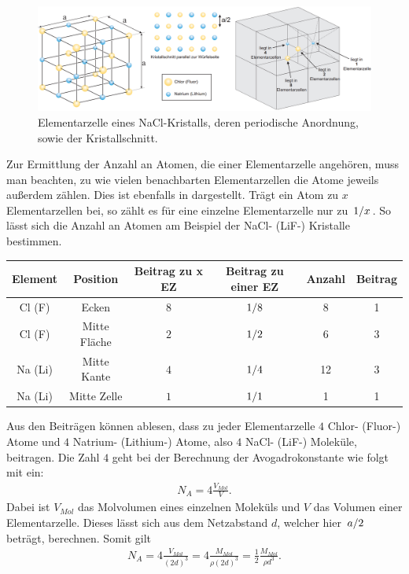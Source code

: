 \begin{figure}[H]
  \centering
  \includegraphics[width=\textwidth]{files/elementarzelle_nacl_reordered.png}
  \caption{Elementarzelle eines NaCl-Kristalls, deren periodische Anordnung, sowie der Kristallschnitt.}
  \label{fig:elementarzelle_nacl_reordered}
\end{figure}

Zur Ermittlung der Anzahl an Atomen, die einer Elementarzelle angehören, muss man beachten, zu wie vielen benachbarten Elementarzellen die Atome jeweils außerdem zählen. Dies ist ebenfalls in  dargestellt. Trägt ein Atom zu $x$ Elementarzellen bei, so zählt es für eine einzelne Elementarzelle nur zu $\flatfrac{1}{x}$. So lässt sich die Anzahl an Atomen am Beispiel der NaCl- (LiF-) Kristalle bestimmen.

\begin{table}[H]
  \centering
  \begin{tabular}{c|c|c|c||c|c}
    Element & Position & Beitrag zu x EZ & Beitrag zu einer EZ & Anzahl & Beitrag\\\hline
    Cl (F) & Ecken & $8$ & $\flatfrac{1}{8}$ & 8 & 1\\
    Cl (F) & Mitte Fläche & $2$ & $\flatfrac{1}{2}$ & 6 & 3\\
    Na (Li) & Mitte Kante & $4$ & $\flatfrac{1}{4}$ & 12 & 3\\
    Na (Li) & Mitte Zelle & $1$ & $\flatfrac{1}{1}$ & 1 & 1\\
  \end{tabular}
\end{table}

Aus den Beiträgen können ablesen, dass zu jeder Elementarzelle $4$ Chlor- (Fluor-) Atome und $4$ Natrium- (Lithium-) Atome, also $4$ NaCl- (LiF-) Moleküle, beitragen. Die Zahl $4$ geht bei der Berechnung der Avogadrokonstante wie folgt mit ein:
\begin{align}
  N_{A} = 4 \frac{V_{Mol}}{V}.
\end{align}
Dabei ist $V_{Mol}$ das Molvolumen eines einzelnen Moleküls und $V$ das Volumen einer Elementarzelle. Dieses lässt sich aus dem Netzabstand $d$, welcher hier $\flatfrac{a}{2}$ beträgt, berechnen. Somit gilt
\begin{align}
  N_A = 4 \frac{V_{Mol}}{(2d)^3} = 4 \frac{M_{Mol}}{\rho (2d)^3} = \frac{1}{2}\frac{M_{Mol}}{\rho d^3}.\label{eq:avogadro}
\end{align}


